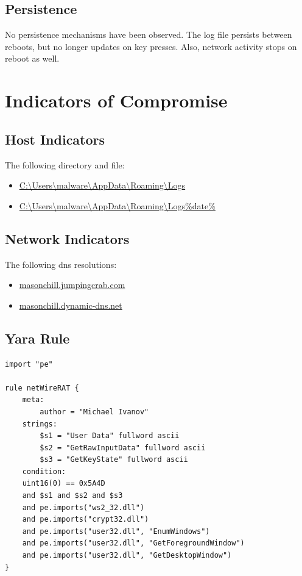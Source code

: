 \documentclass{article}
\begin{document}
    \subsection{Persistence}
    No persistence mechanisms have been observed. The log file persists between reboots, but no longer updates on key presses. Also, network activity stops on reboot as well.
    \pagebreak
    \section{Indicators of Compromise}
    \subsection{Host Indicators}
    The following directory and file:
    \begin{itemize}
        \item \url{C:\Users\malware\AppData\Roaming\Logs}
        \item \url{C:\Users\malware\AppData\Roaming\Logs\%date%}
    \end{itemize}
    \subsection{Network Indicators}
    The following dns resolutions:
    \begin{itemize}
        \item \url{masonchill.jumpingcrab.com}
        \item \url{masonchill.dynamic-dns.net}
    \end{itemize}
    \subsection{Yara Rule}
    \begin{lstlisting}
import "pe"

rule netWireRAT {
    meta:
        author = "Michael Ivanov"
    strings:
        $s1 = "User Data" fullword ascii
        $s2 = "GetRawInputData" fullword ascii
        $s3 = "GetKeyState" fullword ascii
    condition:
    uint16(0) == 0x5A4D
    and $s1 and $s2 and $s3
    and pe.imports("ws2_32.dll") 
    and pe.imports("crypt32.dll") 
    and pe.imports("user32.dll", "EnumWindows") 
    and pe.imports("user32.dll", "GetForegroundWindow") 
    and pe.imports("user32.dll", "GetDesktopWindow")  
}
    \end{lstlisting}
    \pagebreak
    \printbibliography
\end{document}
